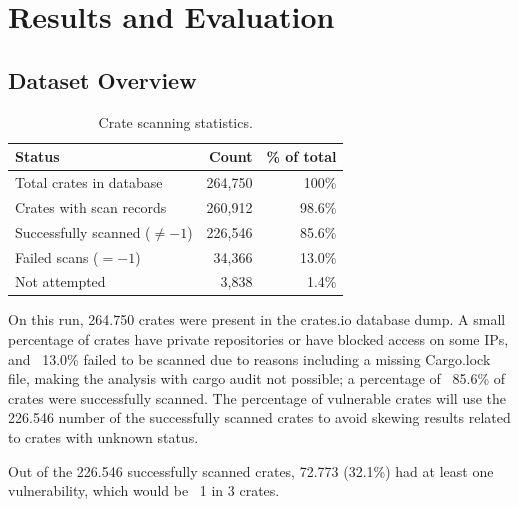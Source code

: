 \chapter{Results and Evaluation}\label{chapter:chap7}

\section{Dataset Overview}\label{sect:dataset-overview}

\begin{table}[ht]
\centering
\caption{Crate scanning statistics.}\label{tab:crate-scan-stats}
\begin{tabular}{|l|r|r|}
\hline
\textbf{Status} & \textbf{Count} & \textbf{\% of total} \\
\hline
Total crates in database          & 264,750 & 100\% \\
Crates with scan records          & 260,912 & 98.6\% \\
Successfully scanned ($\neq -1$)  & 226,546 & 85.6\% \\
Failed scans ($= -1$)             &  34,366 & 13.0\% \\
Not attempted                     &   3,838 &  1.4\% \\
\hline
\end{tabular}
\end{table}

On this run, 264.750 crates were present in the crates.io database dump. A small percentage of crates have private repositories or have blocked access on some IPs, and ~13.0\% failed to be scanned due to reasons including a missing Cargo.lock file, making the analysis with cargo audit not possible; a percentage of ~85.6\% of crates were successfully scanned.
The percentage of vulnerable crates will use the 226.546 number of the successfully scanned crates to avoid skewing results related to crates with unknown status.

Out of the 226.546 successfully scanned crates, 72.773 (32.1\%) had at least one vulnerability, which would be ~1 in 3 crates.

